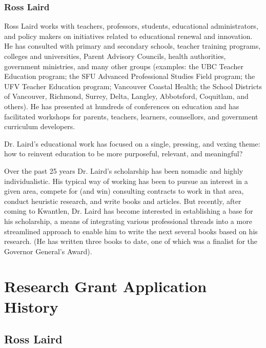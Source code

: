 \documentclass[letterpaper,10pt,headsepline]{scrreprt}
\begin{document}
  \subsubsection{Ross Laird}

  Ross Laird works with teachers, professors, students, educational
  administrators, and policy makers on initiatives related to educational
  renewal and innovation. He has consulted with primary and secondary schools,
  teacher training programs, colleges and universities, Parent Advisory
  Councils, health authorities, government ministries, and many other groups
  (examples: the UBC Teacher Education program; the SFU Advanced Professional
  Studies Field program; the UFV Teacher Education program; Vancouver Coastal
  Health; the School Districts of Vancouver, Richmond, Surrey, Delta, Langley,
  Abbotsford, Coquitlam, and others). He has presented at hundreds of
  conferences on education and has facilitated workshops for parents,
  teachers, learners, counsellors, and government curriculum developers.

  Dr. Laird's educational work has focused on a single, pressing, and vexing
  theme: how to reinvent education to be more purposeful, relevant, and
  meaningful?

  Over the past 25 years Dr. Laird's scholarship has been nomadic and highly
  individualistic. His typical way of working has been to pursue an interest
  in a given area, compete for (and win) consulting contracts to work in that
  area, conduct heuristic research, and write books and articles. But
  recently, after coming to Kwantlen, Dr. Laird has become interested in
  establishing a base for his scholarship, a means of integrating various
  professional threads into a more streamlined approach to enable him to write
  the next several books based on his research. (He has written three books to
  date, one of which was a finalist for the Governor General's Award).

\section{Research Grant Application History}

\subsection{Ross Laird}
\end{document}
